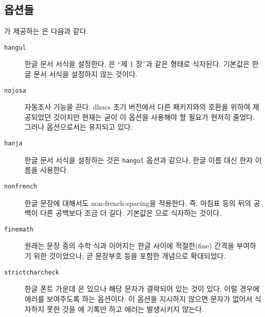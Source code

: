 \subsection{옵션들}
\thispkg 가 제공하는 은 다음과 같다.
\begin{description}
\item[\texttt{hangul}]
한글 문서 서식을 설정한다. 은 ``제 1 장''과 같은 형태로 
식자된다. 기본값은 한글 문서 서식을 설정하지 않는 것이다.
\item[\texttt{nojosa}]
자동조사 기능을 끈다. dhucs 초기 버전에서 다른 패키지와의 호환을
위하여 제공되었던 것이지만 현재는 굳이 이 옵션을 사용해야 할 필요가
현저히 줄었다. 그러나 옵션으로서는 유지되고 있다.
\item[\texttt{hanja}]
한글 문서 서식을 설정하는 것은 \texttt{hangul} 옵션과 같으나,
한글 이름 대신 한자 이름을 사용한다.
\item[\texttt{nonfrench}]
한글 문장에 대해서도 non-french-spacing을 적용한다. 즉, 마침표 등의
뒤의 공백이 다른 공백보다 조금 더 길다. 기본값은 으로
식자하는 것이다.
\item[\texttt{finemath}]
원래는 문장 중의 수학 식과 이어지는
한글 사이에 적절한(fine) 간격을 부여하기 위한 것이었으나, 곧 
문장부호 등을 포함한 개념으로 확대되었다.
\item[\texttt{strictcharcheck}]
한글 폰트 가운데 은 있으나 해당 문자가 결락되어 있는
것이 있다. 이럴 경우에 에러를 보여주도록 하는 옵션이다. 이 옵션을
지시하지 않으면 문자가 없어서 식자하지 못한 것을 에 기록만
하고 에러는 발생시키지 않는다.
\end{description}

